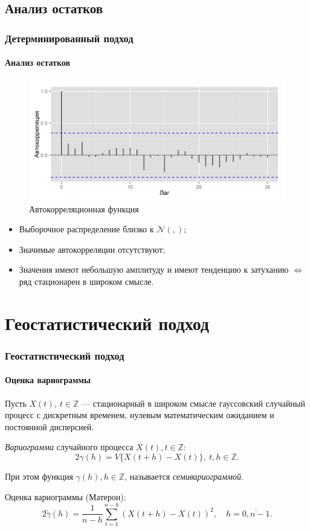 \documentclass{beamer}
\newcommand{\inp}[1]{}
\newcommand{\descriptive}[2]{\inp{#1/descriptive/#2}}
\newcommand{\resnormaldistr}{$\mathcal{N}(\descriptive{residual}{mean}, \descriptive{residual}{variance})$}
\begin{document}
\subsection{Анализ остатков}
\begin{frame}
  \frametitle{Детерминированный подход}
  \framesubtitle{Анализ остатков}
  \begin{figure}[h]
    \includegraphics[width=0.7\linewidth]{../../figures/residual/acf.png}
    \caption{Автокорреляционная функция}
  \end{figure}
  
  {\small
  \begin{itemize}
    \item Выборочное распределение близко к \resnormaldistr;
    \item Значимые автокорреляции отсутствуют;
    \item Значения имеют небольшую амплитуду и имеют тенденцию к затуханию $ \Leftrightarrow $ ряд стационарен в широком смысле.
  \end{itemize}
  }
\end{frame}

\section{Геостатистический подход}
\begin{frame}
  \frametitle{Геостатистический подход}
  \framesubtitle{Оценка вариограммы}
  
  Пусть $ X(t),~ t \in \mathbb{Z} $ --- стационарный в широком смысле гауссовский случайный процесс с дискретным временем, нулевым математическим ожиданием и постоянной дисперсией.
  \begin{Definition}
    \textit{Вариограмма} случайного процесса $ X(t), t \in \mathbb{Z} $:
    \begin{equation}
        2 \gamma (h) = V \{ X(t + h) - X(t) \},~ t, h \in \mathbb{Z}.
    \end{equation}

    При этом функция $ \gamma (h), h \in \mathbb{Z} $, называется \textit{семивариограммой}.
  \end{Definition}
  Оценка вариограммы (Матерон):
  \begin{equation}
    2 \tilde{\gamma}(h) = \frac{1}{n - h} \sum_{t = 1}^{n - h}(X(t + h) - X(t))^2, \quad h = \overline{0, n - 1}.
  \end{equation}
\end{frame}
\end{document}

